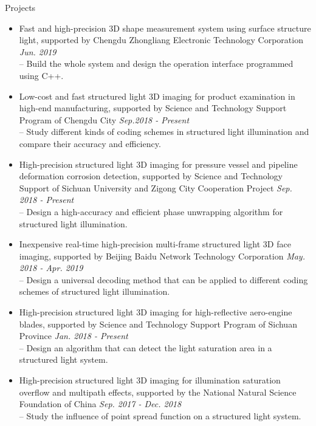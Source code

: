 \documentclass{resume} %
\begin{document}
\begin{rSection}{Projects}
	\begin{itemize}[leftmargin=*]
		\item Fast and high-precision 3D shape measurement system using surface structure light, supported by Chengdu Zhongliang Electronic Technology Corporation \hfill{\em Jun. 2019}\vspace{1.5mm}\\	
		-- Build the whole system and design the operation interface programmed using C++.
		
		\item  Low-cost and fast structured light 3D imaging for product examination in high-end manufacturing, supported by Science and Technology Support Program of Chengdu City 
		\hfill {\em Sep.2018 - Present}\vspace{1.5mm}\\
		-- Study different kinds of coding schemes in structured light illumination and compare their accuracy and efficiency.
		
		\item  High-precision structured light 3D imaging for pressure vessel and pipeline deformation corrosion detection, supported by Science and Technology Support of Sichuan University and Zigong City Cooperation Project \hfill {\em Sep. 2018 - Present}\vspace{1.5mm}\\
		-- Design a high-accuracy and efficient phase unwrapping algorithm for structured light illumination.
		
		\item  Inexpensive real-time high-precision multi-frame structured light 3D face imaging, supported by Beijing Baidu Network Technology Corporation 
		\hfill {\em May. 2018 - Apr. 2019}\vspace{1.5mm}\\
		-- Design a universal decoding method that can be applied to different coding schemes of structured light illumination.
				
		\item  High-precision structured light 3D imaging for high-reflective aero-engine blades, supported by Science and Technology Support Program of Sichuan Province 
		\hfill {\em Jan. 2018 - Present}\vspace{1.5mm}\\
		-- Design an algorithm that can detect the light saturation area in a structured light system.
		
		\item  High-precision structured light 3D imaging for illumination saturation overflow and multipath effects, supported by the National Natural Science Foundation of China 
		\hfill {\em Sep. 2017 - Dec. 2018}\vspace{1.5mm}\\		
		-- Study the influence of point spread function on a structured light system.
		

\end{itemize}
\end{rSection}
\end{document}
